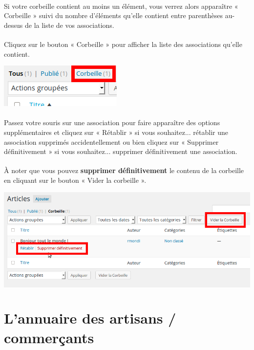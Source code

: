 \documentclass[10pt,a4paper]{article}
\begin{document}
\paragraph{}Si votre corbeille contient au moins un élément, vous verrez alors apparaître « Corbeille » suivi du nombre d’éléments qu’elle contient entre parenthèses au-dessus de la liste de vos associations.
\paragraph{}Cliquez sur le bouton « Corbeille » pour afficher la liste des associations qu’elle contient.
\begin{center}
\includegraphics[scale=0.35]{img/0069.png}
\end{center}
\paragraph{}Passez votre souris sur une association pour faire apparaître des options supplémentaires et cliquez sur « Rétablir » si vous souhaitez... rétablir une association supprimés accidentellement ou bien cliquez sur « Supprimer définitivement » si vous souhaitez... supprimer définitivement une association.
\paragraph{}À noter que vous pouvez \textbf{supprimer définitivement} le contenu de la corbeille en cliquant sur le bouton « Vider la corbeille ».
\begin{center}
\includegraphics[scale=0.35]{img/0070.png}
\end{center}
\newpage

\section{L'annuaire des artisans / commerçants}
\end{document}
